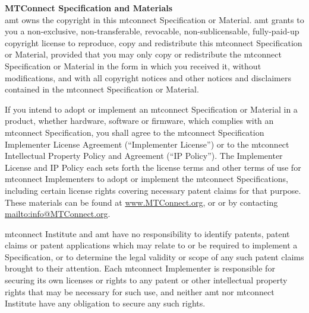 \documentclass{mtconnect}	%
\begin{document}
\begin{nolinenumbers}
\maketitle				%


\textbf{\color{mtc1}\Large MTConnect Specification and Materials} \\

\gls{amt} owns the copyright in this \gls{mtconnect} Specification or Material. \gls{amt} grants to you a non-exclusive, non-transferable, revocable, non-sublicensable, fully-paid-up copyright license to reproduce, copy and redistribute this \gls{mtconnect} Specification or Material, provided that you may only copy or redistribute the \gls{mtconnect} Specification or Material in the form in which you received it, without modifications, and with all copyright notices and other notices and disclaimers contained in the \gls{mtconnect} Specification or Material.

If you intend to adopt or implement an \gls{mtconnect} Specification or Material in a product, whether hardware, software or firmware, which complies with an \gls{mtconnect} Specification, you shall agree to the \gls{mtconnect} Specification Implementer License Agreement (``Implementer License'') or to the \gls{mtconnect} Intellectual Property Policy and Agreement (``IP Policy''). The Implementer License and IP Policy each sets forth the license terms and other terms of use for \gls{mtconnect} Implementers to adopt or implement the \gls{mtconnect} Specifications, including certain license rights covering necessary patent claims for that purpose. These materials can be found at \url{www.MTConnect.org}, or or by contacting \url{mailto:info@MTConnect.org}. 

\gls{mtconnect} Institute and \gls{amt} have no responsibility to identify patents, patent claims or patent applications which may relate to or be required to implement a Specification, or to determine the legal validity or scope of any such patent claims brought to their attention. Each \gls{mtconnect} Implementer is responsible for securing its own licenses or rights to any patent or other intellectual property rights that may be necessary for such use, and neither \gls{amt} nor \gls{mtconnect} Institute have any obligation to secure any such rights.


\end{nolinenumbers}
\end{document}
